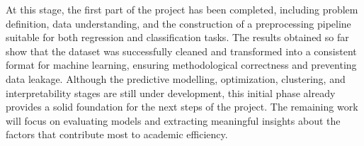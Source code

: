 
At this stage, the first part of the project has been completed, including problem definition, data understanding, and the construction of a preprocessing pipeline suitable for both regression and classification tasks. The results obtained so far show that the dataset was successfully cleaned and transformed into a consistent format for machine learning, ensuring methodological correctness and preventing data leakage. Although the predictive modelling, optimization, clustering, and interpretability stages are still under development, this initial phase already provides a solid foundation for the next steps of the project. The remaining work will focus on evaluating models and extracting meaningful insights about the factors that contribute most to academic efficiency.